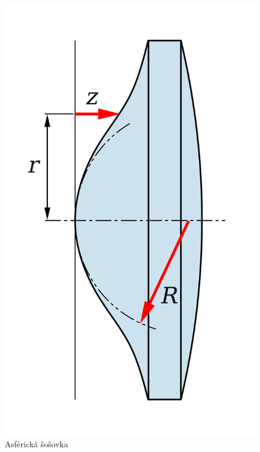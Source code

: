 \documentclass[10pt,xcolor=pdflatex]{beamer}
\begin{document}
\begin{frame}
\begin{columns}
\begin{figure}
        \includegraphics[scale=0.05]{img/asphericLen.png}
        \caption{Asférická šošovka}
    \end{figure}
    \end{columns}
\end{frame}
\end{document}
